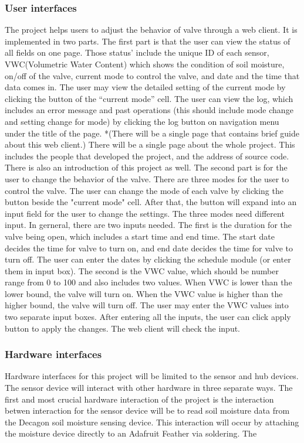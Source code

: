 \documentclass[onecolumn, draftclsnofoot,10pt, compsoc]{IEEEtran}
\begin{document}
    	\subsubsection{User interfaces}
        The project helps users to adjust the behavior of valve through a web client. 
        It is implemented in two parts. 
        The first part is that the user can view the status of all fields on one page. Those status' include the unique ID of each sensor, VWC(Volumetric Water Content) which shows the condition of soil moisture, on/off of the valve, current mode to control the valve, and date and the time that data comes in. 
        The user may view the detailed setting of the current mode by clicking the button of the “current mode” cell.
        The user can view the log, which includes an error message and past operations (this should include mode change and setting change for mode) by clicking the log button on navigation menu under the title of the page.
        *(There will be a single page that contains brief guide about this web client.)
        There will be a single page about the whole project. 
        This includes the people that developed the project, and the address of source code.
        There is also an introduction of this project as well.
        The second part is for the user to change the behavior of the valve.
        There are three modes for the user to control the valve.
        The user can change the mode of each valve by clicking the button beside the "current mode" cell. 
        After that, the button will expand into an input field for the user to change the settings.
        The three modes need different input. 
        In gerneral, there are two inputs needed. 
        The first is the duration for the valve being open, which includes a start time and end time.
        The start date decides the time for valve to turn on, and end date decides the time for valve to turn off.
        The user can enter the dates by clicking the schedule module (or enter them in input box).
        The second is the VWC value, which should be number range from 0 to 100 and also includes two values.
        When VWC is lower than the lower bound, the valve will turn on.
        When the VWC value is higher than the higher bound, the valve will turn off.
        The user may enter the VWC values into two separate input boxes.
        After entering all the inputs, the user can click apply button to apply the changes. The web client will check the input.
        \subsubsection{Hardware interfaces}
        Hardware interfaces for this project will be limited to the sensor and hub devices.
        The sensor device will interact with other hardware in three separate ways.
        The first and most crucial hardware interaction of the project is the interaction betwen
        interaction for the sensor device will be to read soil moisture data from the Decagon soil moisture sensing device.
        This interaction will occur by attaching the moisture device directly to an Adafruit Feather via soldering.
        The 
\end{document}
